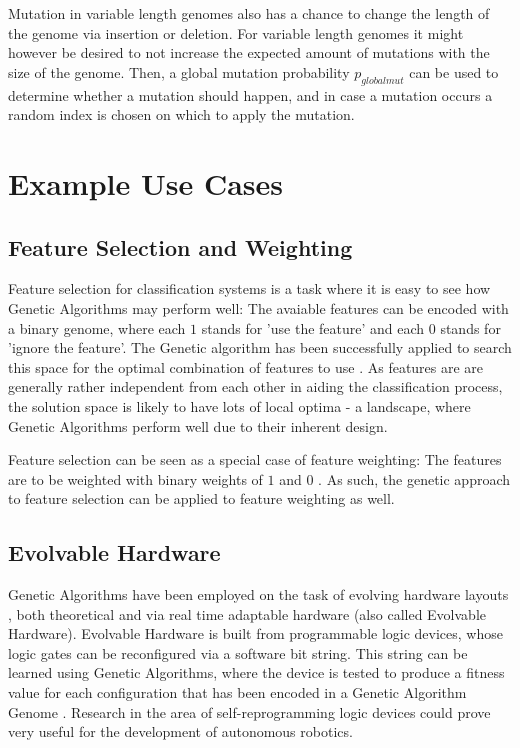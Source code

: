 \documentclass[11pt,a4paper,twoside,openright]{scrbook}
\begin{document}
Mutation in variable length genomes also has a chance to change the length of the genome via insertion or deletion. For variable length genomes it might however be desired to not increase the expected amount of mutations with the size of the genome. Then, a global mutation probability \(p_{globalmut}\) can be used to determine whether a mutation should happen, and in case a mutation occurs a random index is chosen on which to apply the mutation.

\section{Example Use Cases}

\subsection{Feature Selection and Weighting}
Feature selection for classification systems is a task where it is easy to see how Genetic Algorithms may perform well: The avaiable features can be encoded with a binary genome, where each \(1\) stands for 'use the feature' and each \(0\) stands for 'ignore the feature'. The Genetic algorithm has been successfully applied to search this space for the optimal combination of features to use \cite[e.g.]{Yang98}. As features are are generally rather independent from each other in aiding the classification process, the solution space is likely to have lots of local optima - a landscape, where Genetic Algorithms perform well due to their inherent design.

Feature selection can be seen as a special case of feature weighting: The features are to be weighted with binary weights of \(1\) and \(0\) \cite[p.\,2]{Yang98}. As such, the genetic approach to feature selection can be applied to feature weighting as well.

\subsection{Evolvable Hardware}
Genetic Algorithms have been employed on the task of evolving hardware layouts \cite[e.g.]{Higuchi96}, both theoretical and via real time adaptable hardware (also called Evolvable Hardware). Evolvable Hardware is built from programmable logic devices, whose logic gates can be reconfigured via a software bit string. This string can be learned using Genetic Algorithms, where the device is tested to produce a fitness value for each configuration that has been encoded in a Genetic Algorithm Genome \cite{Higuchi06}. Research in the area of self-reprogramming logic devices could prove very useful for the development of autonomous robotics.
\end{document}
